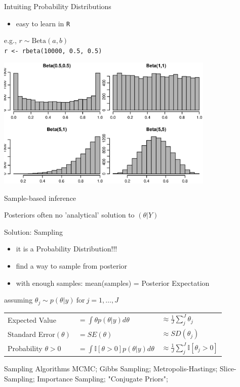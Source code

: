 \documentclass[presentation,9pt,xcolor=dvipsnames]{beamer}
\begin{document}
\begin{frame}[fragile,label={sec:org8a882f1}]{Intuiting Probability Distributions}
 \begin{itemize}
\item easy to learn in \texttt{R} \\
\end{itemize}
e.g., \(r\sim\text{Beta}(a,b)\) \\
\texttt{r <- rbeta(10000, 0.5, 0.5)}
\begin{center}
\includegraphics[width=0.78\textwidth,height=0.78\textheight]{beta.eps}
\end{center}
\end{frame}
\begin{frame}[label={sec:org42d1306}]{Sample-based inference}
\begin{block}{Posteriors}
often no 'analytical' solution to \((\theta\vert Y)\)
\end{block}
\begin{block}{Solution: \alert{Sampling}}
\begin{itemize}
\item it is a Probability Distribution!!!
\item find a way to sample from posterior
\item with enough samples: mean(samples) = Posterior Expectation
\end{itemize}
assuming \(\theta_j\sim p(\theta\vert y)\ \text{for}\ j=1,\dots,J\)
\begin{center}
\begin{tabular}{lll}
Expected Value & \(=\int\theta p(\theta\vert y)d\theta\) & \(\approx\frac{1}{J}\sum_j^J\theta_j\)\\
Standard Error\((\theta)\) & \(=SE(\theta)\) & \(\approx SD(\theta_j)\)\\
Probability \(\theta>0\) & \(=\int\mathbb{I}[\theta>0]p(\theta\vert y)d\theta\) & \(\approx\frac{1}{J}\sum_j^J\mathbb{I}[\theta_j>0]\)\\
\end{tabular}
\end{center}
\end{block}

\begin{block}{Sampling Algorithms}
MCMC; Gibbs Sampling; Metropolis-Hastings; Slice-Sampling; Importance Sampling; "Conjugate Priors";
\end{block}
\end{frame}
\end{document}

